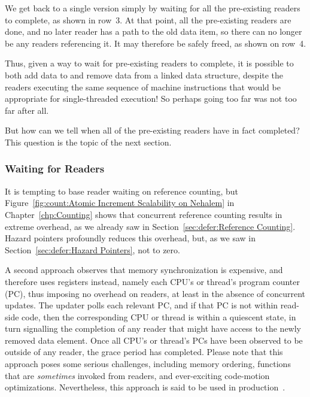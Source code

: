 We get back to a single version simply by waiting for all the
pre-existing readers to complete, as shown in row~3.
At that point, all the pre-existing readers are done, and no later
reader has a path to the old data item, so there can no longer be
any readers referencing it.
It may therefore be safely freed, as shown on row~4.

Thus, given a way to wait for pre-existing readers to complete,
it is possible to both add data to and remove data from a linked
data structure, despite the readers executing the same sequence
of machine instructions that would be appropriate for single-threaded
execution!
So perhaps going too far was not too far after all.

But how can we tell when all of the pre-existing readers have in
fact completed?
This question is the topic of the next section.

\subsubsection{Waiting for Readers}
\label{sec:defer:Waiting for Readers}

It is tempting to base reader waiting on reference counting, but
Figure~\ref{fig:count:Atomic Increment Scalability on Nehalem}
in
Chapter~\ref{chp:Counting}
shows that concurrent reference counting results in extreme overhead,
as we already saw in
Section~\ref{sec:defer:Reference Counting}.
Hazard pointers profoundly reduces this overhead, but, as we saw in
Section~\ref{sec:defer:Hazard Pointers}, not to zero.

A second approach observes that memory synchronization is expensive,
and therefore uses registers instead, namely each CPU's or thread's
program counter (PC), thus imposing no overhead on readers, at least
in the absence of concurrent updates.
The updater polls each relevant PC, and if that PC is not within read-side
code, then the corresponding CPU or thread is within a quiescent state,
in turn signalling the completion of any reader that might have access
to the newly removed data element.
Once all CPU's or thread's PCs have been observed to be outside of any
reader, the grace period has completed.
Please note that this approach poses some serious challenges, including
memory ordering, functions that are \emph{sometimes} invoked from readers,
and ever-exciting code-motion optimizations.
Nevertheless, this approach is said to be used in
production~\cite{MikeAsh2015Apple}.

